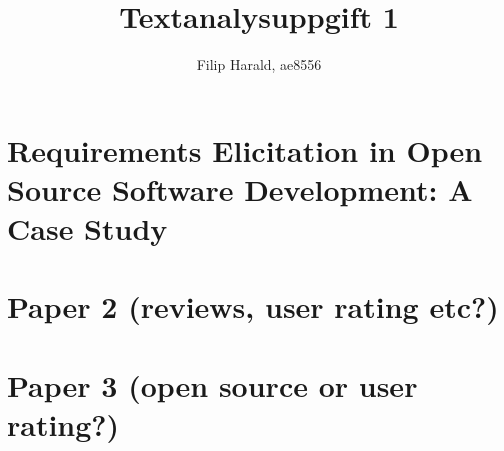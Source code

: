 \documentclass[11pt, oneside]{article}   	%
\title{Textanalysuppgift 1}
\author{Filip Harald, ae8556}
\begin{document}
\maketitle
\tableofcontents

\newpage
\section{Requirements Elicitation in Open Source Software
Development: A Case Study}

\newpage
\section{Paper 2 (reviews, user rating etc?)}

\newpage
\section{Paper 3 (open source or user rating?)}
\end{document}
